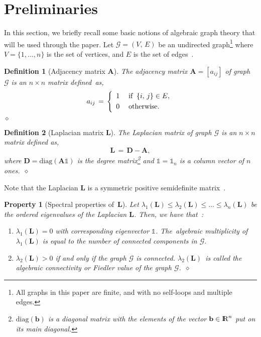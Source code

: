 \documentclass[letterpaper,9pt,twocolumn]{autart}
\newcommand{\rr}{\mathop{{\rm I}\mskip-4.0mu{\rm R}}\nolimits}
\newcommand{\vet}[1]{\ensuremath{{\mathbf #1}}}
\newtheorem{definition}{\textbf{Definition}}
\newtheorem{property}{\textbf{Property}}
\begin{document}
\section{Preliminaries}\label{Sec:prel}
In this section, we briefly recall some basic notions of algebraic graph
theory that will be used through the paper.
Let $\mathcal{G} = (V,\,E)$ be an undirected graph\footnote{All graphs in this paper
are finite, and with no self-loops and multiple edges.} where
$V = \{1,\ldots,n\}$ is the set of vertices, and $E$ is the set of edges~\cite{GodsilRo_book01}.
\begin{definition}[Adjacency matrix $\vet{A}$]\label{Def1}
The adjacency matrix $\vet{A} = [a_{ij}]$ of graph $\mathcal{G}$ is an $n \times n$
matrix defined~as, \begin{equation*}\label{Eq:Ad_mat_gen}
a_{ij} \,=\, \left\{
\begin{array}{ll}
1\; & \text{if}\;\; \{i,\,j\} \in E,\vspace{0.1cm}\\
0\; & \text{otherwise}.
\end{array}
\right. \vspace{-0.45cm}
\end{equation*}
\hfill$\diamond$
\end{definition}
\begin{definition}[Laplacian matrix $\vet{L}$]
The Laplacian matrix of graph $\mathcal{G}$ is an $n \times n$ matrix defined as,
$$
\vet{L} \,=\, \vet{D} - \vet{A},
$$
where $\vet{D} = \text{diag}(\vet{A}\mathds{1})$ is the degree 
matrix\footnote{$\text{diag}(\vet{b})$ is a diagonal matrix with the
elements of the vector $\vet{b} \in \rr^n$ put on its main diagonal.} and $\mathds{1} = \mathds{1}_n$ is a
column vector of $n$ ones.~\hfill$\diamond$
\end{definition}
Note that the Laplacian $\vet{L}$ is a symmetric positive semidefinite matrix~\cite{Mohar_GRCA91}.
\begin{property}[Spectral properties of\, $\vet{L}$]\label{Sp_propL}
Let $\lambda_1(\vet{L}) \leq \lambda_2(\vet{L}) \leq \ldots \leq \lambda_n(\vet{L})$ be the
ordered eigenvalues of the Laplacian $\vet{L}$. Then, we have that~\cite{Abreu_LAA07}:
\begin{enumerate}
\item $\lambda_1(\vet{L}) = 0$ with corresponding eigenvector $\mathds{1}$. The~algebraic multiplicity of $\lambda_1(\vet{L})$ is equal to the number of connected
components in $\mathcal{G}$.
\item $\lambda_2(\vet{L}) > 0$ if and only if the graph $\mathcal{G}$
  is connected. $\lambda_2(\vet{L})$~is called the
  \emph{algebraic connectivity} or \emph{Fiedler value} of the graph
  $\mathcal{G}$.~\hfill$\diamond$\end{enumerate}
\end{property}
\end{document}
